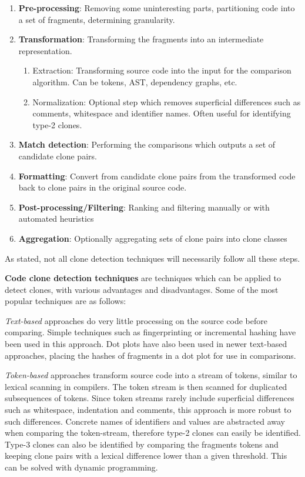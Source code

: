 \documentclass[12pt]{article}
\begin{document}
\begin{enumerate}
	\item \textbf{Pre-processing}: Removing some uninteresting parts, partitioning code into a set
	      of fragments, determining granularity.
	\item \textbf{Transformation}: Transforming the fragments into an intermediate representation.
	      \begin{enumerate}
		      \item Extraction: Transforming source code into the input for the comparison
		            algorithm. Can be tokens, AST, dependency graphs, etc.
		      \item Normalization: Optional step which removes superficial differences such as
		            comments, whitespace and identifier names. Often useful for identifying type-2
		            clones.
	      \end{enumerate}
	\item \textbf{Match detection}: Performing the comparisons which outputs a set of
	      candidate clone pairs.
	\item \textbf{Formatting}: Convert from candidate clone pairs from the transformed
	      code back to clone pairs in the original source code.
	\item \textbf{Post-processing/Filtering}: Ranking and filtering manually or with
	      automated heuristics
	\item \textbf{Aggregation}: Optionally aggregating sets of clone pairs into clone classes
\end{enumerate}

As stated, not all clone detection techniques will necessarily follow all these steps.

\textbf{Code clone detection techniques} are techniques which can be applied to detect
clones, with various advantages and disadvantages. Some of the most popular techniques are
as follows:

\textit{Text-based} approaches do very little processing on the source code before
comparing. Simple techniques such as fingerprinting or incremental hashing have been used
in this approach. Dot plots have also been used in newer text-based approaches, placing
the hashes of fragments in a dot plot for use in comparisons.

\textit{Token-based} approaches transform source code into a stream of tokens, similar to
lexical scanning in compilers. The token stream is then scanned for duplicated
subsequences of tokens. Since token streams rarely include superficial differences
such as whitespace, indentation and comments, this approach is more robust to such
differences. Concrete names of identifiers and values are abstracted away when comparing
the token-stream, therefore type-2 clones can easily be identified. Type-3 clones can also
be identified by comparing the fragments tokens and keeping clone pairs with a lexical
difference lower than a given threshold. This can be solved with dynamic
programming\cite{BakerSparseDynamicProgramming}.
\end{document}
